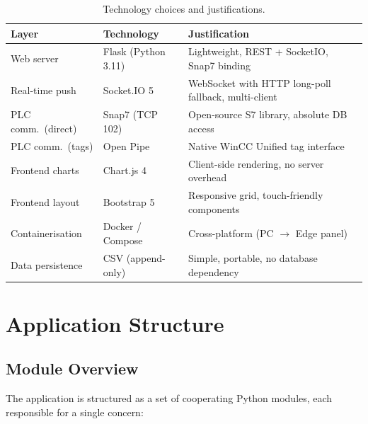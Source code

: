 \begin{table}[H]
  \centering
  \caption{Technology choices and justifications.}
  \label{tab:techstack}
  \begin{tabular}{@{}L{3.2cm}L{3.5cm}L{6.3cm}@{}}
    \toprule
    \textbf{Layer} & \textbf{Technology} & \textbf{Justification} \\
    \midrule
    Web server       & Flask (Python 3.11) & Lightweight, REST + SocketIO, Snap7 binding \\
    Real-time push   & Socket.IO 5         & WebSocket with HTTP long-poll fallback, multi-client \\
    PLC comm.\ (direct) & Snap7 (TCP 102) & Open-source S7 library, absolute DB access \\
    PLC comm.\ (tags)   & Open Pipe       & Native WinCC Unified tag interface \\
    Frontend charts  & Chart.js 4          & Client-side rendering, no server overhead \\
    Frontend layout  & Bootstrap 5         & Responsive grid, touch-friendly components \\
    Containerisation & Docker / Compose    & Cross-platform (PC $\rightarrow$ Edge panel) \\
    Data persistence & CSV (append-only)   & Simple, portable, no database dependency \\
    \bottomrule
  \end{tabular}
\end{table}

\section{Application Structure}

\subsection{Module Overview}

The application is structured as a set of cooperating Python modules, each responsible
for a single concern:

